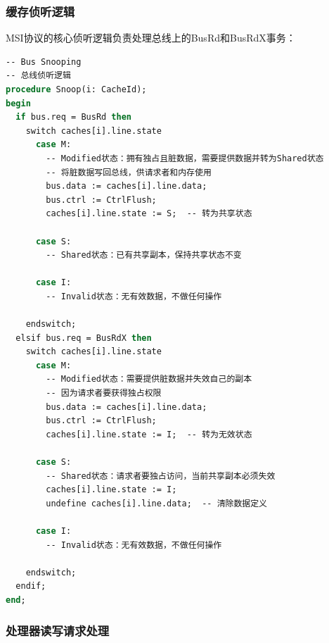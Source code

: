 \documentclass[a4paper]{article}
\begin{document}
\subsubsection{缓存侦听逻辑}

MSI协议的核心侦听逻辑负责处理总线上的BusRd和BusRdX事务：

\begin{lstlisting}[language=pascal]
-- Bus Snooping
-- 总线侦听逻辑
procedure Snoop(i: CacheId);
begin
  if bus.req = BusRd then
    switch caches[i].line.state
      case M:
        -- Modified状态：拥有独占且脏数据，需要提供数据并转为Shared状态
        -- 将脏数据写回总线，供请求者和内存使用
        bus.data := caches[i].line.data;
        bus.ctrl := CtrlFlush;
        caches[i].line.state := S;  -- 转为共享状态

      case S:
        -- Shared状态：已有共享副本，保持共享状态不变

      case I:
        -- Invalid状态：无有效数据，不做任何操作

    endswitch;
  elsif bus.req = BusRdX then
    switch caches[i].line.state
      case M:
        -- Modified状态：需要提供脏数据并失效自己的副本
        -- 因为请求者要获得独占权限
        bus.data := caches[i].line.data;
        bus.ctrl := CtrlFlush;
        caches[i].line.state := I;  -- 转为无效状态

      case S:
        -- Shared状态：请求者要独占访问，当前共享副本必须失效
        caches[i].line.state := I;
        undefine caches[i].line.data;  -- 清除数据定义

      case I:
        -- Invalid状态：无有效数据，不做任何操作

    endswitch;
  endif;
end;
\end{lstlisting}

\subsubsection{处理器读写请求处理}
\end{document}
